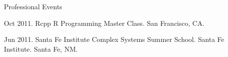 \documentclass{resume} %
\begin{document}
\clearpage

\begin{rSection}{Professional Events}
\item Oct 2011. Rcpp R Programming Master Class. San Francisco, CA.
\item Jun 2011. Santa Fe Institute Complex Systems Summer School. Santa Fe Institute. Santa Fe, NM. 
\end{rSection}
\end{document}
